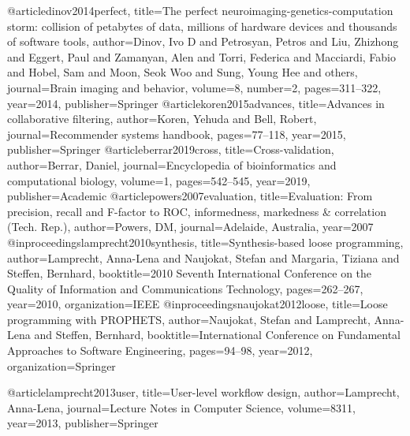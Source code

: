 @article{dinov2014perfect,
  title={The perfect neuroimaging-genetics-computation storm: collision of petabytes of data, millions of hardware devices and thousands of software tools},
  author={Dinov, Ivo D and Petrosyan, Petros and Liu, Zhizhong and Eggert, Paul and Zamanyan, Alen and Torri, Federica and Macciardi, Fabio and Hobel, Sam and Moon, Seok Woo and Sung, Young Hee and others},
  journal={Brain imaging and behavior},
  volume={8},
  number={2},
  pages={311--322},
  year={2014},
  publisher={Springer}
}
@article{koren2015advances,
  title={Advances in collaborative filtering},
  author={Koren, Yehuda and Bell, Robert},
  journal={Recommender systems handbook},
  pages={77--118},
  year={2015},
  publisher={Springer}
}
@article{berrar2019cross,
  title={Cross-validation},
  author={Berrar, Daniel},
  journal={Encyclopedia of bioinformatics and computational biology},
  volume={1},
  pages={542--545},
  year={2019},
  publisher={Academic}
}
@article{powers2007evaluation,
  title={Evaluation: From precision, recall and F-factor to ROC, informedness, markedness \& correlation (Tech. Rep.)},
  author={Powers, DM},
  journal={Adelaide, Australia},
  year={2007}
}
@inproceedings{lamprecht2010synthesis,
  title={Synthesis-based loose programming},
  author={Lamprecht, Anna-Lena and Naujokat, Stefan and Margaria, Tiziana and Steffen, Bernhard},
  booktitle={2010 Seventh International Conference on the Quality of Information and Communications Technology},
  pages={262--267},
  year={2010},
  organization={IEEE}
}
@inproceedings{naujokat2012loose,
  title={Loose programming with PROPHETS},
  author={Naujokat, Stefan and Lamprecht, Anna-Lena and Steffen, Bernhard},
  booktitle={International Conference on Fundamental Approaches to Software Engineering},
  pages={94--98},
  year={2012},
  organization={Springer}
}

@article{lamprecht2013user,
  title={User-level workflow design},
  author={Lamprecht, Anna-Lena},
  journal={Lecture Notes in Computer Science},
  volume={8311},
  year={2013},
  publisher={Springer}
}

